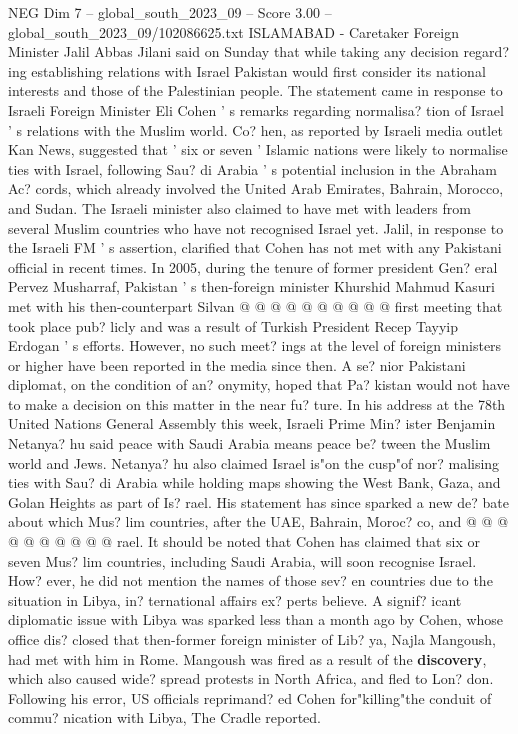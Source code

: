 \begin{textsample}{NEG Dim 7 – global\_south\_2023\_09 – Score 3.00 – global\_south\_2023\_09/102086625.txt}  \label{ex:f7_neg_446}
ISLAMABAD - Caretaker Foreign Minister Jalil Abbas Jilani said on Sunday that while taking any decision regard? ing establishing relations with Israel Pakistan would first consider its national interests and those of the Palestinian people.
The statement came in response to Israeli Foreign Minister Eli Cohen ' s remarks regarding normalisa? tion of Israel ' s relations with the Muslim world.
Co? hen, as reported by Israeli media outlet Kan News, suggested that ' six or seven ' Islamic nations were likely to normalise ties with Israel, following Sau? di Arabia ' s potential inclusion in the Abraham Ac? cords, which already involved the United Arab Emirates, Bahrain, Morocco, and Sudan.
The Israeli minister also claimed to have met with leaders from several Muslim countries who have not recognised Israel yet.
Jalil, in response to the Israeli FM ' s assertion, clarified that Cohen has not met with any Pakistani official in recent times.
In 2005, during the tenure of former president Gen? eral Pervez Musharraf, Pakistan ' s then-foreign minister Khurshid Mahmud Kasuri met with his then-counterpart Silvan @ @ @ @ @ @ @ @ @ @ first meeting that took place pub? licly and was a result of Turkish President Recep Tayyip Erdogan ' s efforts.
However, no such meet? ings at the level of foreign ministers or higher have been reported in the media since then.
A se? nior Pakistani diplomat, on the condition of an? onymity, hoped that Pa? kistan would not have to make a decision on this matter in the near fu? ture.
In his address at the 78th United Nations General Assembly this week, Israeli Prime Min? ister Benjamin Netanya? hu said peace with Saudi Arabia means peace be? tween the Muslim world and Jews.
Netanya? hu also claimed Israel is"on the cusp"of nor? malising ties with Sau? di Arabia while holding maps showing the West Bank, Gaza, and Golan Heights as part of Is? rael.
His statement has since sparked a new de? bate about which Mus? lim countries, after the UAE, Bahrain, Moroc? co, and @ @ @ @ @ @ @ @ @ @ rael.
It should be noted that Cohen has claimed that six or seven Mus? lim countries, including Saudi Arabia, will soon recognise Israel.
How? ever, he did not mention the names of those sev? en countries due to the situation in Libya, in? ternational affairs ex? perts believe.
A signif? icant diplomatic issue with Libya was sparked less than a month ago by Cohen, whose office dis? closed that then-former foreign minister of Lib? ya, Najla Mangoush, had met with him in Rome.
Mangoush was fired as a result of the \textbf{discovery}, which also caused wide? spread protests in North Africa, and fled to Lon? don.
Following his error, US officials reprimand? ed Cohen for"killing"the conduit of commu? nication with Libya, The Cradle reported.

\end{textsample}
